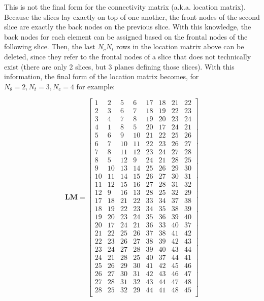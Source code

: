 \documentclass[10pt]{article}
\begin{document}
This is not the final form for the connectivity matrix (a.k.a. location matrix). Because the slices lay exactly on top of one another, the front nodes of the second slice are exactly the back nodes on the previous slice. With this knowledge, the back nodes for each element can be assigned based on the frontal nodes of the following slice. Then, the last \(N_cN_t\) rows in the location matrix above can be deleted, since they refer to the frontal nodes of a slice that does not technically exist (there are only 2 slices, but 3 planes defining those slices). With this information, the final form of the location matrix becomes, for \(N_\theta=2, N_t=3, N_c=4\) for example:

\begin{equation}
\textbf{LM}=
\begin{bmatrix}
1 & 2 & 5 & 6 & 17 & 18 & 21 & 22\\
2 & 3 & 6 & 7 & 18 & 19 & 22 & 23\\
3 & 4 & 7 & 8 & 19 & 20 & 23 & 24\\
4 & 1 & 8 & 5 & 20 & 17 & 24 & 21\\
5 & 6 & 9 & 10 & 21 & 22 & 25 & 26\\
6 & 7 & 10 & 11 & 22 & 23 & 26 & 27\\
7 & 8 & 11 & 12 & 23 & 24 & 27 & 28\\
8 & 5 & 12 & 9 & 24 & 21 & 28 & 25\\
9 & 10 & 13 & 14 & 25 & 26 & 29 & 30\\
10 & 11 & 14 & 15 & 26 & 27 & 30 & 31\\
11 & 12 & 15 & 16 & 27 & 28 & 31 & 32\\
12 & 9 & 16 & 13 & 28 & 25 & 32 & 29\\
17 & 18 & 21 & 22 & 33 & 34 & 37 & 38\\
18 & 19 & 22 & 23 & 34 & 35 & 38 & 39\\
19 & 20 & 23 & 24 & 35 & 36 & 39 & 40\\
20 & 17 & 24 & 21 & 36 & 33 & 40 & 37\\
21 & 22 & 25 & 26 & 37 & 38 & 41 & 42\\
22 & 23 & 26 & 27 & 38 & 39 & 42 & 43\\
23 & 24 & 27 & 28 & 39 & 40 & 43 & 44\\
24 & 21 & 28 & 25 & 40 & 37 & 44 & 41\\
25 & 26 & 29 & 30 & 41 & 42 & 45 & 46\\
26 & 27 & 30 & 31 & 42 & 43 & 46 & 47\\
27 & 28 & 31 & 32 & 43 & 44 & 47 & 48\\
28 & 25 & 32 & 29 & 44 & 41 & 48 & 45\\
\end{bmatrix}
\end{equation}
\end{document}
